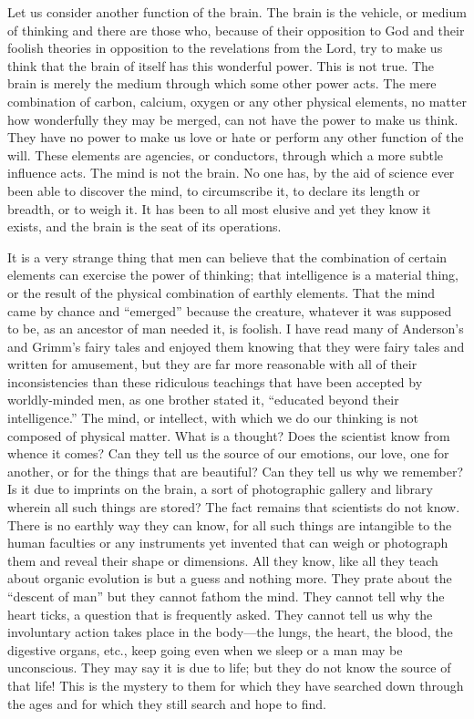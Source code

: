 Let us consider another function of the brain. The brain is the vehicle, or medium of thinking
and there are those who, because of their opposition to God and their foolish theories in
opposition to the revelations from the Lord, try to make us think that the brain of itself has
this wonderful power. This is not true. The brain is merely the medium through which some
other power acts. The mere combination of carbon, calcium, oxygen or any other physical
elements, no matter how wonderfully they may be merged, can not have the power to make
us think. They have no power to make us love or hate or perform any other function of the
will. These elements are agencies, or conductors, through which a more subtle influence acts.
The mind is not the brain. No one has, by the aid of science ever been able to discover the
mind, to circumscribe it, to declare its length or breadth, or to weigh it. It has been to all most
elusive and yet they know it exists, and the brain is the seat of its operations.

It is a very strange thing that men can believe that the combination of certain elements can
exercise the power of thinking; that intelligence is a material thing, or the result of the
physical combination of earthly elements. That the mind came by chance and ``emerged''
because the creature, whatever it was supposed to be, as an ancestor of man needed it, is
foolish. I have read many of Anderson's and Grimm's fairy tales and enjoyed them knowing
that they were fairy tales and written for amusement, but they are far more reasonable with
all of their inconsistencies than these ridiculous teachings that have been accepted by
worldly-minded men, as one brother stated it, ``educated beyond their intelligence.'' The
mind, or intellect, with which we do our thinking is not composed of physical matter. What is
a thought? Does the scientist know from whence it comes? Can they tell us the source of our
emotions, our love, one for another, or for the things that are beautiful? Can they tell us why
we remember? Is it due to imprints on the brain, a sort of photographic gallery and library
wherein all such things are stored? The fact remains that scientists do not know. There is no
earthly way they can know, for all such things are intangible to the human faculties or any
instruments yet invented that can weigh or photograph them and reveal their shape or
dimensions. All they know, like all they teach about organic evolution is but a guess and
nothing more. They prate about the ``descent of man'' but they cannot fathom the mind. They
cannot tell why the heart ticks, a question that is frequently asked. They cannot tell us why
the involuntary action takes place in the body—the lungs, the heart, the blood, the digestive
organs, etc., keep going even when we sleep or a man may be unconscious. They may say it
is due to life; but they do not know the source of that life! This is the mystery to them for
which they have searched down through the ages and for which they still search and hope to
find.

